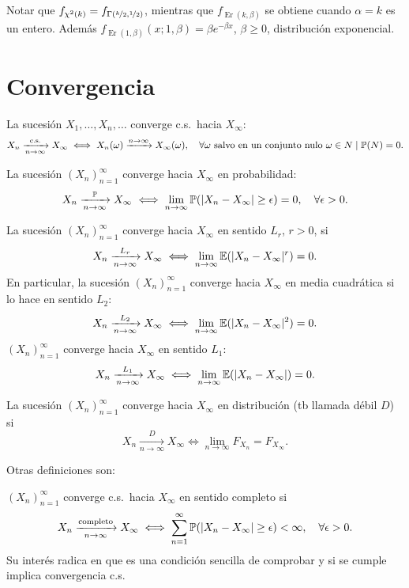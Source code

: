 \textcolor{azulresalt}{
Notar que $f_{\chi^2(k)} = f_{\Gamma(\nicefrac{k}{2}, \nicefrac{1}{2})}$, mientras que $f_{\operatorname{Er}(k,\beta)}$ se obtiene cuando $\alpha = k$ es un entero. Además $f_{\operatorname{Er}(1,\beta)}(x; 1, \beta) = \beta e^{-\beta x}$, $\beta \ge 0$, distribución exponencial.}

\section{Convergencia}

\begin{definicion}[32]
La sucesión $X_1, \dots, X_n, \dots$ converge c.s.\ hacia $X_\infty$:
\[
  X_n \xrightarrow[n\to\infty]{\text{c.s.}} X_\infty \iff X_n(\omega) \xrightarrow{n\to\infty} X_\infty(\omega), \quad \forall \omega \text{ salvo en un conjunto nulo } \omega \in N \mid \mathbb{P}(N) = 0.
\]
\end{definicion}

\begin{definicion}[33]
La sucesión $(X_n)_{n=1}^\infty$ converge hacia $X_\infty$ en probabilidad:
\[
  X_n \xrightarrow[n\to\infty]{\mathbb{P}} X_\infty \iff \lim_{n\to\infty} \mathbb{P}(|X_n - X_\infty| \ge \epsilon) = 0, \quad \forall \epsilon > 0.
\]
\end{definicion}

\begin{definicion}[28]
La sucesión $(X_n)_{n=1}^\infty$ converge hacia $X_\infty$ en sentido $L_r$, $r > 0$, si
\[
  X_n \xrightarrow[n\to\infty]{L_r} X_\infty \iff \lim_{n\to\infty} \mathbb{E}(|X_n - X_\infty|^r) = 0.
\]
En particular, la sucesión $(X_n)_{n=1}^\infty$ converge hacia $X_\infty$ en media cuadrática si lo hace en sentido $L_2$:
\[
  X_n \xrightarrow[n\to\infty]{L_2} X_\infty \iff \lim_{n\to\infty} \mathbb{E}(|X_n - X_\infty|^2) = 0.
\]
$(X_n)_{n=1}^\infty$ converge hacia $X_\infty$ en sentido $L_1$:
\[
  X_n \xrightarrow[n\to\infty]{L_1} X_\infty \iff \lim_{n\to\infty} \mathbb{E}(|X_n - X_\infty|) = 0.
\]
\end{definicion}

\begin{definicion}[29]
La sucesión $(X_n)_{n=1}^\infty$ converge hacia $X_\infty$ en distribución (tb llamada débil $D$) si
\[
  X_n \xrightarrow[n\to\infty]{D} X_\infty \iff \lim_{n\to\infty} F_{X_n} = F_{X_\infty}.
\]
\end{definicion}
\textcolor{azulresalt}{
Otras definiciones son:
\begin{definicion}[30]
$(X_n)_{n=1}^\infty$ converge c.s.\ hacia $X_\infty$ en sentido completo si
\[
  X_n \xrightarrow[n\to\infty]{\text{completo}} X_\infty \iff \sum_{n=1}^\infty \mathbb{P}(|X_n - X_\infty| \ge \epsilon) < \infty, \quad \forall \epsilon > 0.
\]
Su interés radica en que es una condición sencilla de comprobar y si se cumple implica convergencia c.s.
\end{definicion}}


